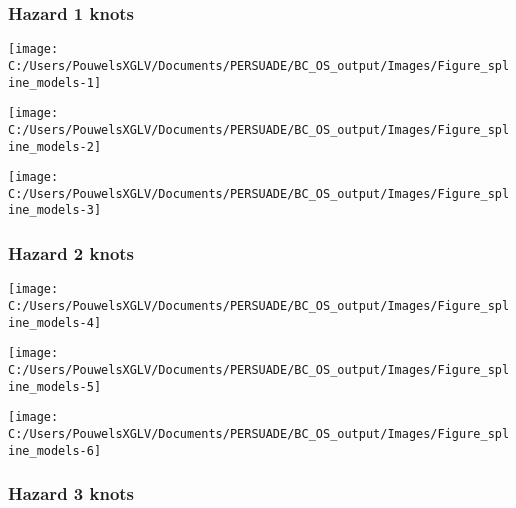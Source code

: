 \documentclass[
]{article}
\begin{document}
\clearpage

\clearpage

\subsubsection{Hazard 1 knots}\label{hazard-1-knots}

\begin{flushleft}\texttt{[image: C:/Users/PouwelsXGLV/Documents/PERSUADE/BC\_OS\_output/Images/Figure\_spline\_models-1]} \end{flushleft}

\begin{flushleft}\texttt{[image: C:/Users/PouwelsXGLV/Documents/PERSUADE/BC\_OS\_output/Images/Figure\_spline\_models-2]} \end{flushleft}

\begin{flushleft}\texttt{[image: C:/Users/PouwelsXGLV/Documents/PERSUADE/BC\_OS\_output/Images/Figure\_spline\_models-3]} \end{flushleft}

\clearpage

\subsubsection{Hazard 2 knots}\label{hazard-2-knots}

\begin{flushleft}\texttt{[image: C:/Users/PouwelsXGLV/Documents/PERSUADE/BC\_OS\_output/Images/Figure\_spline\_models-4]} \end{flushleft}

\begin{flushleft}\texttt{[image: C:/Users/PouwelsXGLV/Documents/PERSUADE/BC\_OS\_output/Images/Figure\_spline\_models-5]} \end{flushleft}

\begin{flushleft}\texttt{[image: C:/Users/PouwelsXGLV/Documents/PERSUADE/BC\_OS\_output/Images/Figure\_spline\_models-6]} \end{flushleft}

\clearpage

\subsubsection{Hazard 3 knots}\label{hazard-3-knots}
\end{document}
